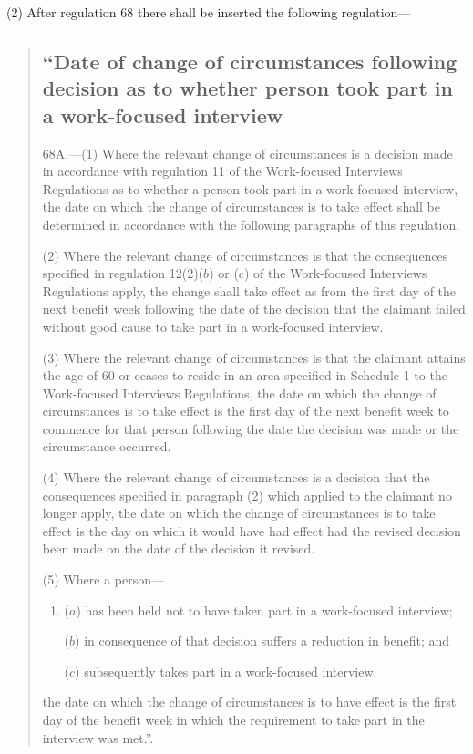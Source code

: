 \documentclass[12pt,a4paper]{article}
\begin{document}
(2) After regulation 68 there shall be inserted the following regulation—
\begin{quotation}
\subsection*{“Date of change of circumstances following decision as to whether person took part in a work-focused interview}

68A.---(1)  Where the relevant change of circumstances is a decision made in accordance with regulation 11 of the Work-focused Interviews Regulations as to whether a person took part in a work-focused interview, the date on which the change of circumstances is to take effect shall be determined in accordance with the following paragraphs of this regulation.

(2) Where the relevant change of circumstances is that the consequences specified in regulation 12(2)($b$)  or ($c$)  of the Work-focused Interviews Regulations apply, the change shall take effect as from the first day of the next benefit week following the date of the decision that the claimant failed without good cause to take part in a work-focused interview.

(3) Where the relevant change of circumstances is that the claimant attains the age of 60 or ceases to reside in an area specified in Schedule 1 to the Work-focused Interviews Regulations, the date on which the change of circumstances is to take effect is the first day of the next benefit week to commence for that person following the date the decision was made or the circumstance occurred.

(4) Where the relevant change of circumstances is a decision that the consequences specified in paragraph (2) which applied to the claimant no longer apply, the date on which the change of circumstances is to take effect is the day on which it would have had effect had the revised decision been made on the date of the decision it revised.

(5) Where a person—
\begin{enumerate}\item[]
($a$) has been held not to have taken part in a work-focused interview;

($b$) in consequence of that decision suffers a reduction in benefit; and

($c$) subsequently takes part in a work-focused interview,
\end{enumerate}
the date on which the change of circumstances is to have effect is the first day of the benefit week in which the requirement to take part in the interview was met.”.
\end{quotation}
\end{document}
